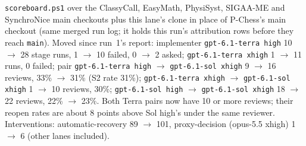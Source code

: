 \documentclass[11pt,a4paper]{article}
\begin{document}
\texttt{scoreboard.ps1} over the ClassyCall, EasyMath, PhysiSyst, SIGAA-ME and SynchroNice main
checkouts plus this lane's clone in place of P-Chess's main checkout (same merged run log; it
holds this run's attribution rows before they reach \texttt{main}). Moved since run~1's report:
implementer \texttt{gpt-6.1-terra high} 10 $\to$ 28 stage runs, 1 $\to$ 10 failed, 0 $\to$ 2
asked; \texttt{gpt-6.1-terra xhigh} 1 $\to$ 11 runs, 0 failed; pair \texttt{gpt-6.1-terra high}
$\rightarrow$ \texttt{gpt-6.1-sol xhigh} 9 $\to$ 16 reviews, 33\% $\to$ 31\% (S2 rate 31\%);
\texttt{gpt-6.1-terra xhigh} $\rightarrow$ \texttt{gpt-6.1-sol xhigh} 1 $\to$ 10 reviews, 30\%;
\texttt{gpt-6.1-sol high} $\rightarrow$ \texttt{gpt-6.1-sol xhigh} 18 $\to$ 22 reviews, 22\%
$\to$ 23\%. Both Terra pairs now have 10 or more reviews; their reopen rates are about 8 points
above Sol high's under the same reviewer. Interventions: automatic-recovery 89 $\to$ 101,
proxy-decision (opus-5.5 xhigh) 1 $\to$ 6 (other lanes included).
\end{document}
